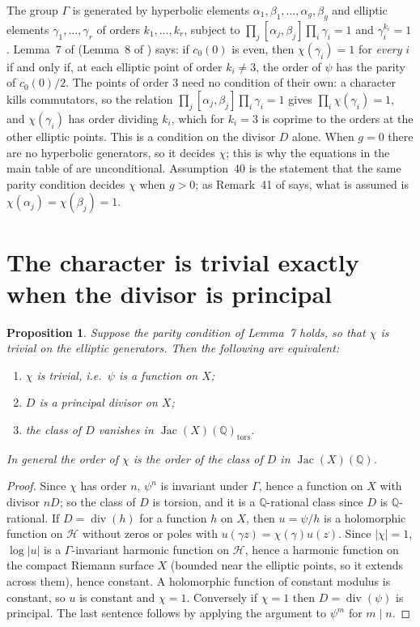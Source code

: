 \documentclass[11pt,reqno]{amsart}
\theoremstyle{plain}
\newtheorem{proposition}[theorem]{Proposition}
\theoremstyle{definition}
\DeclareMathOperator{\Jac}{Jac}
\DeclareMathOperator{\divisor}{div}
\newcommand{\Q}{\mathbb{Q}}
\newcommand{\HH}{\mathcal{H}}
\begin{document}
The group $\Gamma$ is generated by hyperbolic elements $\alpha_1, \beta_1, \dots, \alpha_g,
\beta_g$ and elliptic elements $\gamma_1, \dots, \gamma_r$ of orders $k_1, \dots, k_r$, subject to
$\prod_j [\alpha_j, \beta_j] \prod_i \gamma_i = 1$ and $\gamma_i^{k_i} = 1$. Lemma~7 of \cite{GY}
(Lemma~8 of \cite{Yang}) says: if $c_0(0)$ is even, then $\chi(\gamma_i) = 1$ for \emph{every} $i$ if
and only if, at each elliptic point of order $k_i \neq 3$, the order of $\psi$ has the parity of
$c_0(0)/2$. The points of order $3$ need no condition of their own: a character kills commutators,
so the relation $\prod_j [\alpha_j, \beta_j] \prod_i \gamma_i = 1$ gives $\prod_i \chi(\gamma_i) = 1$,
and $\chi(\gamma_i)$ has order dividing $k_i$, which for $k_i = 3$ is coprime to the orders at the
other elliptic points. This is a condition on the divisor $D$ alone. When $g = 0$ there are no
hyperbolic generators, so it decides $\chi$; this is why the equations in the main table of
\cite{GY} are unconditional. Assumption~40 is the statement that the same parity condition
decides $\chi$ when $g > 0$; as Remark~41 of \cite{GY} says, what is assumed is
$\chi(\alpha_j) = \chi(\beta_j) = 1$.

\section{The character is trivial exactly when the divisor is principal}

\begin{proposition}\label{prop:principal}
Suppose the parity condition of Lemma~7 holds, so that $\chi$ is trivial on the elliptic
generators. Then the following are equivalent:
\begin{enumerate}
\item $\chi$ is trivial, i.e.\ $\psi$ is a function on $X$;
\item $D$ is a principal divisor on $X$;
\item the class of $D$ vanishes in $\Jac(X)(\Q)_{\mathrm{tors}}$.
\end{enumerate}
In general the order of $\chi$ is the order of the class of $D$ in $\Jac(X)(\Q)$.
\end{proposition}

\begin{proof}
Since $\chi$ has order $n$, $\psi^n$ is invariant under $\Gamma$, hence a function on $X$ with
divisor $nD$; so the class of $D$ is torsion, and it is a $\Q$-rational class since $D$ is
$\Q$-rational. If $D = \divisor(h)$ for a function $h$ on $X$, then $u = \psi/h$ is a
holomorphic function on $\HH$ without zeros or poles with $u(\gamma z) = \chi(\gamma) u(z)$.
Since $|\chi| = 1$, $\log|u|$ is a $\Gamma$-invariant harmonic function on $\HH$, hence a
harmonic function on the compact Riemann surface $X$ (bounded near the elliptic points, so it
extends across them), hence constant. A holomorphic function of constant modulus is constant, so
$u$ is constant and $\chi = 1$. Conversely if $\chi = 1$ then $D = \divisor(\psi)$ is principal. The last sentence follows by applying the
argument to $\psi^m$ for $m \mid n$.
\end{proof}
\end{document}
